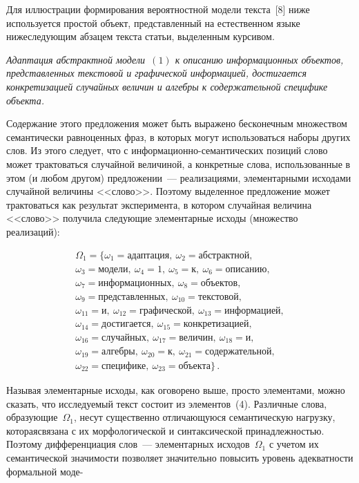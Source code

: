 \begin{multicols}{2}
  Для иллюстрации формирования вероятностной модели текста~[8] ниже
используется простой объект, представленный на естественном языке
нижеследующим абзацем текста статьи, выделенным курсивом.

  \textit{Адаптация абстрактной модели~$(1)$ к описанию информационных
объектов, представленных текстовой и графической информацией,
достигается конкретизацией случайных величин и алгебры к содержательной
специфике объекта.}

  Содержание этого предложения может быть выражено бесконечным
множеством семантически равноценных фраз, в которых могут использоваться
наборы других слов. Из этого следует, что с
  ин\-фор\-ма\-ци\-он\-но-се\-ман\-ти\-че\-ских позиций слово может
трактоваться случайной величиной, а конкретные слова, использованные в этом
(и любом другом) предложении~--- реализациями, элементарными исходами
случайной величины <<слово>>. Поэтому выделенное предложение может
трактоваться как результат эксперимента, в котором случайная величина
<<слово>> получила следующие элементарные исходы (множество
реализаций):

\vspace*{-2pt}

\noindent
  \begin{multline}
  \Omega_1 =\{\omega_1 = \mbox{адаптация},\ \omega_2 = \mbox{абстрактной},\\
\omega_3 = \mbox{модели},\
  \omega_4 = 1,\ \omega_5 = \mbox{к},\  \omega_6 = \mbox{описанию},\\
  \omega_7 =
\mbox{информационных},\ \omega_8 = \mbox{объектов},\\
\omega_9 = \mbox{представленных},\
  \omega_{10} = \mbox{текстовой},\\
  \omega_{11} = \mbox{и},\ \omega_{12} =
\mbox{графической},\ \omega_{13} = \mbox{информацией},\\
  \omega_{14} = \mbox{достигается},\ \omega_{15}= \mbox{конкретизацией},\\
  \omega_{16} = \mbox{случайных},\ \omega_{17} = \mbox{величин},\ \omega_{18} =
\mbox{и},\\
\omega_{19} = \mbox{алгебры},\ \omega_{20} = \mbox{к},\
  \omega_{21} = \mbox{содержательной},\\
  \omega_{22}= \mbox{специфике},\ \omega_{23} = \mbox{объекта}\}\,.
  \label{e4-kuz}
  \end{multline}

  \vspace*{-2pt}

  Называя элементарные исходы, как оговорено выше, просто элементами,
можно сказать, что исследуемый текст состоит из элементов~(4). Различ\-ные
слова, образующие~$\Omega_1$, несут существенно отличающуюся
семантическую нагрузку, которая\linebreak связа\-на с их морфологической и
синтаксической принадлежностью. Поэтому дифференциация слов~---
элементарных исходов~$\Omega_1$ с учетом их семантической значимости
позволяет значительно повысить уровень адекватности формальной моде-\linebreak\vspace*{-12pt}
\columnbreak


\end{multicols}

